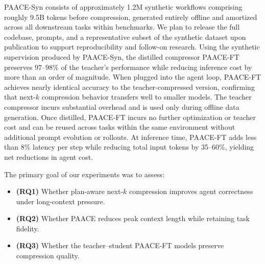 \documentclass{article}
\theoremstyle{plain}
\theoremstyle{definition}
\theoremstyle{remark}
\begin{document}
PAACE-Syn consists of approximately 1.2M synthetic workflows comprising roughly
9.5B tokens before compression, generated entirely offline and amortized across
all downstream tasks within benchmarks. We plan to release the full codebase, prompts,
and a representative subset of the synthetic dataset upon publication to support
reproducibility and follow-on research. Using the synthetic supervision produced by PAACE-Syn, the distilled compressor PAACE-FT preserves $97$--$98\%$ of the teacher's performance while reducing inference cost by more than an order of magnitude. When plugged into the agent loop, PAACE-FT achieves nearly identical accuracy to the teacher-compressed version, confirming that next-$k$ compression behavior transfers well to smaller models.
The teacher compressor incurs substantial overhead and is used only during offline data generation.
Once distilled, PAACE-FT incurs no further optimization or teacher cost and can be reused across tasks
within the same environment without additional prompt evolution or rollouts.
At inference time, PAACE-FT adds less than 8\% latency per step while reducing total input tokens by
35--60\%, yielding net reductions in agent cost.


The primary goal of our experiments was to assess:
\vspace{-4pt}
\begin{itemize}\setlength{\itemsep}{0pt}\setlength{\parskip}{0pt}\setlength{\parsep}{0pt}\setlength{\topsep}{2pt}
    \item \textbf{(RQ1)} Whether plan-aware next-$k$ compression improves agent correctness under long-context pressure.
    \item \textbf{(RQ2)} Whether PAACE reduces peak context length while retaining task fidelity.
    \item \textbf{(RQ3)} Whether the teacher--student PAACE-FT models preserve compression quality.
\end{itemize}
\end{document}
